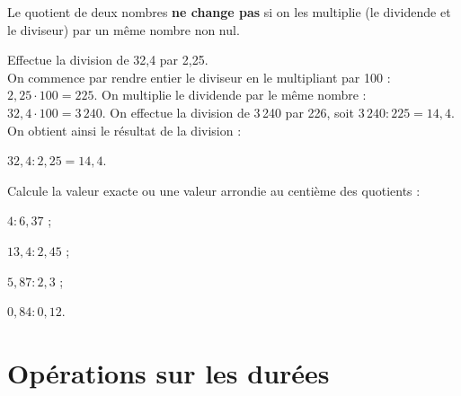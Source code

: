 
\begin{aconnaitre}
Le quotient de deux nombres \textbf{ne change pas} si on les multiplie (le dividende et le diviseur) par un même nombre non nul.
\end{aconnaitre}


\begin{methode*1}

\begin{exemple*1}
Effectue la division de 32,4 par 2,25.\\[1em]
On commence par rendre entier le diviseur en le multipliant par 100 : $2,25 \cdot 100 = 225$. On multiplie le dividende par le même nombre : $32,4 \cdot 100 = 3\,240$. On effectue la division de 3\,240  par 226, soit $3\,240 : 225 = 14,4$. On obtient ainsi le résultat de la division :

$32,4 : 2,25 = 14,4$. 
\end{exemple*1}

\exercice

Calcule la valeur exacte ou une valeur arrondie au centième des quotients :
\begin{colenumerate}{4}
 \item $4 : 6,37$ ;
 \item $13,4 : 2,45$ ;
 \item $5,87 : 2,3$ ;
 \item $0,84 : 0,12$.
 \end{colenumerate}

\end{methode*1}


\section{Opérations sur les durées}



